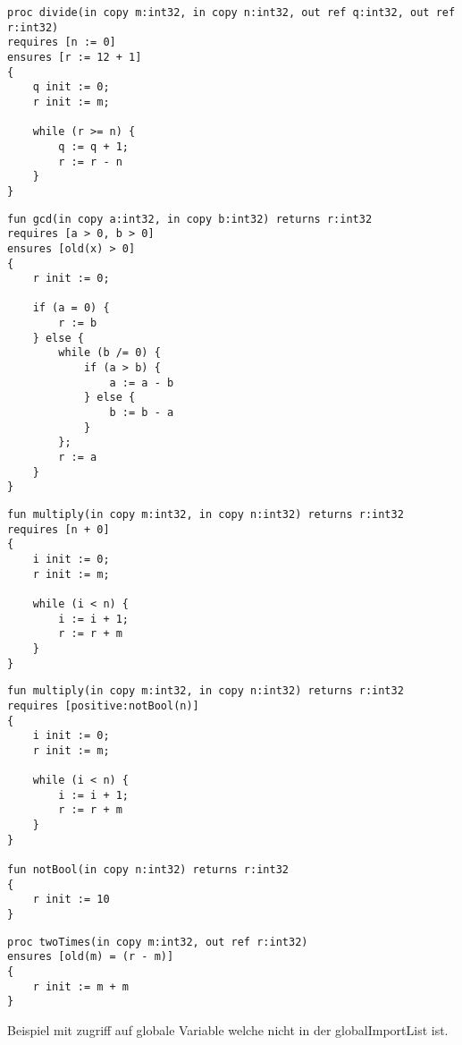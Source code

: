 \begin{lstlisting}[caption=Wert einer Variable in der pre-/postcondition ändern]
proc divide(in copy m:int32, in copy n:int32, out ref q:int32, out ref r:int32)
requires [n := 0]
ensures [r := 12 + 1]
{
    q init := 0;
    r init := m;

    while (r >= n) {
        q := q + 1;
        r := r - n
    }
}
\end{lstlisting}

\begin{lstlisting}[caption=Zugriff auf nicht vorhandene Variable in der old Funktion]
fun gcd(in copy a:int32, in copy b:int32) returns r:int32
requires [a > 0, b > 0]
ensures [old(x) > 0]
{
    r init := 0;
    
    if (a = 0) {
        r := b
    } else {
        while (b /= 0) {
            if (a > b) {
                a := a - b
            } else {
                b := b - a
            }
        };
        r := a
    }
}
\end{lstlisting}

\begin{lstlisting}[caption=Eine nicht Boolsche Expression in der Condition List]
fun multiply(in copy m:int32, in copy n:int32) returns r:int32
requires [n + 0]
{
    i init := 0;
    r init := m;

    while (i < n) {
        i := i + 1;
        r := r + m
    }
}
\end{lstlisting}

\begin{lstlisting}[caption=Eine Funktion in der Condition List welche keinen Boolschen Wert zurückliefert]
fun multiply(in copy m:int32, in copy n:int32) returns r:int32
requires [positive:notBool(n)]
{
    i init := 0;
    r init := m;

    while (i < n) {
        i := i + 1;
        r := r + m
    }
}

fun notBool(in copy n:int32) returns r:int32
{
    r init := 10
}
\end{lstlisting}

\begin{lstlisting}[caption=Test]
proc twoTimes(in copy m:int32, out ref r:int32)
ensures [old(m) = (r - m)]
{
    r init := m + m
}
\end{lstlisting}

Beispiel mit zugriff auf globale Variable welche nicht in der globalImportList ist.
